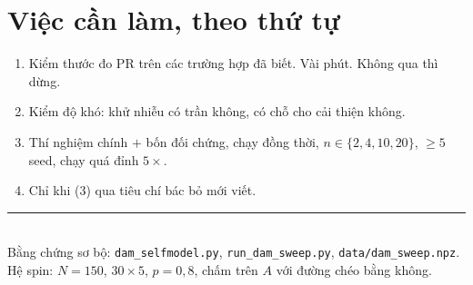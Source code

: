 \documentclass[11pt,a4paper]{article}
\begin{document}
\section{Việc cần làm, theo thứ tự}

\begin{enumerate}[leftmargin=7mm,itemsep=1mm]
\item Kiểm thước đo $\mathrm{PR}$ trên các trường hợp đã biết. Vài phút.
Không qua thì dừng.
\item Kiểm độ khó: khử nhiễu có trần không, có chỗ cho cải thiện không.
\item Thí nghiệm chính $+$ bốn đối chứng, chạy đồng thời, $n\in\{2,4,10,20\}$,
$\ge 5$ seed, chạy quá đỉnh $5\times$.
\item Chỉ khi (3) qua tiêu chí bác bỏ mới viết.
\end{enumerate}

\vspace{3mm}
\noindent\rule{\textwidth}{0.4pt}\\[1mm]
{\small Bằng chứng sơ bộ: \texttt{dam\_selfmodel.py}, \texttt{run\_dam\_sweep.py},
\texttt{data/dam\_sweep.npz}. Hệ spin: $N=150$, $30\times5$, $p=0{,}8$, chấm trên
$A$ với đường chéo bằng không.}
\end{document}
